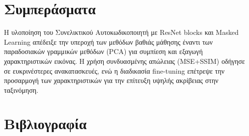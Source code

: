 \documentclass[11pt,a4paper]{article}
\begin{document}
\section{Συμπεράσματα}
Η υλοποίηση του Συνελικτικού Αυτοκωδικοποιητή με ResNet blocks και Masked Learning απέδειξε την υπεροχή των μεθόδων βαθιάς μάθησης έναντι των παραδοσιακών γραμμικών μεθόδων (PCA) για συμπίεση και εξαγωγή χαρακτηριστικών εικόνας. Η χρήση συνδυασμένης απώλειας (MSE+SSIM) οδήγησε σε ευκρινέστερες ανακατασκευές, ενώ η διαδικασία fine-tuning επέτρεψε την προσαρμογή των χαρακτηριστικών για την επίτευξη υψηλής ακρίβειας στην ταξινόμηση.

\newpage

\section{Βιβλιογραφία}
\end{document}
